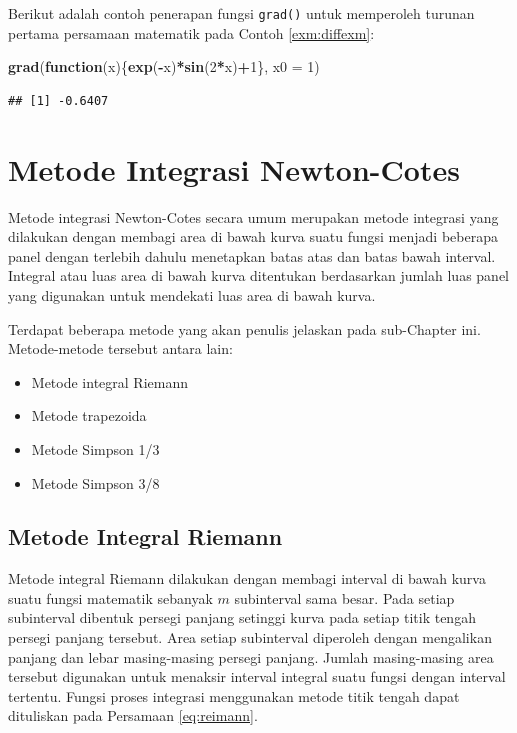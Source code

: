 \documentclass[
]{book}
\newenvironment{Shaded}{\begin{snugshade}}{\end{snugshade}}
\newcommand{\AttributeTok}[1]{\textcolor[rgb]{0.13,0.29,0.53}{#1}}
\newcommand{\ControlFlowTok}[1]{\textcolor[rgb]{0.13,0.29,0.53}{\textbf{#1}}}
\newcommand{\DecValTok}[1]{\textcolor[rgb]{0.00,0.00,0.81}{#1}}
\newcommand{\FunctionTok}[1]{\textcolor[rgb]{0.13,0.29,0.53}{\textbf{#1}}}
\newcommand{\NormalTok}[1]{#1}
\newcommand{\SpecialCharTok}[1]{\textcolor[rgb]{0.81,0.36,0.00}{\textbf{#1}}}
\providecommand{\tightlist}{%
  \setlength{\itemsep}{0pt}\setlength{\parskip}{0pt}}
\theoremstyle{definition}
\theoremstyle{definition}
\theoremstyle{definition}
\theoremstyle{definition}
\theoremstyle{remark}
\begin{document}
Berikut adalah contoh penerapan fungsi \texttt{grad()} untuk memperoleh turunan pertama persamaan matematik pada Contoh \ref{exm:diffexm}:

\begin{Shaded}
\begin{Highlighting}[]
\FunctionTok{grad}\NormalTok{(}\ControlFlowTok{function}\NormalTok{(x)\{}\FunctionTok{exp}\NormalTok{(}\SpecialCharTok{{-}}\NormalTok{x)}\SpecialCharTok{*}\FunctionTok{sin}\NormalTok{(}\DecValTok{2}\SpecialCharTok{*}\NormalTok{x)}\SpecialCharTok{+}\DecValTok{1}\NormalTok{\}, }\AttributeTok{x0 =} \DecValTok{1}\NormalTok{)}
\end{Highlighting}
\end{Shaded}

\begin{verbatim}
## [1] -0.6407
\end{verbatim}

\hypertarget{newtoncotes}{%
\section{Metode Integrasi Newton-Cotes}\label{newtoncotes}}

Metode integrasi Newton-Cotes secara umum merupakan metode integrasi yang dilakukan dengan membagi area di bawah kurva suatu fungsi menjadi beberapa panel dengan terlebih dahulu menetapkan batas atas dan batas bawah interval. Integral atau luas area di bawah kurva ditentukan berdasarkan jumlah luas panel yang digunakan untuk mendekati luas area di bawah kurva.

Terdapat beberapa metode yang akan penulis jelaskan pada sub-Chapter ini. Metode-metode tersebut antara lain:

\begin{itemize}
\tightlist
\item
  Metode integral Riemann
\item
  Metode trapezoida
\item
  Metode Simpson 1/3
\item
  Metode Simpson 3/8
\end{itemize}

\hypertarget{riemann}{%
\subsection{Metode Integral Riemann}\label{riemann}}

Metode integral Riemann dilakukan dengan membagi interval di bawah kurva suatu fungsi matematik sebanyak \(m\) subinterval sama besar. Pada setiap subinterval dibentuk persegi panjang setinggi kurva pada setiap titik tengah persegi panjang tersebut. Area setiap subinterval diperoleh dengan mengalikan panjang dan lebar masing-masing persegi panjang. Jumlah masing-masing area tersebut digunakan untuk menaksir interval integral suatu fungsi dengan interval tertentu. Fungsi proses integrasi menggunakan metode titik tengah dapat dituliskan pada Persamaan \eqref{eq:reimann}.
\end{document}
